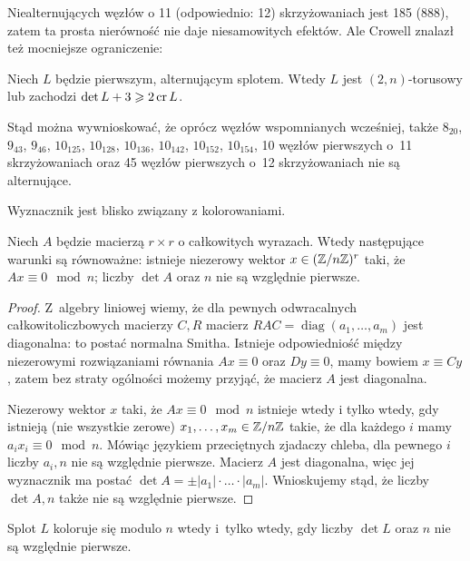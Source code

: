 Niealternujących węzłów o 11 (odpowiednio: 12) skrzyżowaniach jest 185 (888), zatem ta prosta nierówność nie daje niesamowitych efektów.
Ale Crowell znalazł też mocniejsze ograniczenie:

\begin{proposition}
    Niech $L$ będzie pierwszym, alternującym splotem.
    Wtedy $L$ jest $(2, n)$-torusowy lub zachodzi $\det L + 3 \geqslant 2 \operatorname{cr} L$.
\end{proposition}

Stąd można wywnioskować, że oprócz węzłów wspomnianych wcześniej, także $8_{20}$, 
$9_{43}$, $9_{46}$, $10_{125}$, $10_{128}$, $10_{136}$, $10_{142}$, $10_{152}$, $10_{154}$, 10 węzłów pierwszych o~11 skrzyżowaniach oraz 45 węzłów pierwszych o~12 skrzyżowaniach nie są alternujące.

Wyznacznik jest blisko związany z kolorowaniami.

\begin{lemma}
    Niech $A$ będzie macierzą $r \times r$ o całkowitych wyrazach.
    Wtedy następujące warunki są równoważne: istnieje niezerowy wektor $x \in (\mathbb Z/n\mathbb Z)^r$ taki, że $Ax \equiv 0 \mod n$; liczby $\det A$ oraz $n$ nie są względnie pierwsze.
\end{lemma}

\begin{proof}
    Z~algebry liniowej wiemy, że dla pewnych odwracalnych całkowitoliczbowych macierzy $C, R$ macierz $RAC = \operatorname{diag}(a_1, \ldots, a_m)$ jest diagonalna: to postać normalna Smitha.
    Istnieje odpowiedniość między niezerowymi rozwiązaniami równania $Ax \equiv 0$ oraz $Dy \equiv 0$, mamy bowiem $x \equiv Cy$, zatem bez straty ogólności możemy przyjąć, że macierz $A$ jest diagonalna.

    Niezerowy wektor $x$ taki, że $Ax \equiv 0 \mod n$ istnieje wtedy i tylko wtedy, gdy istnieją (nie wszystkie zerowe) $x_1, \ldots, x_m \in \mathbb Z/n\mathbb Z$ takie, że dla każdego $i$ mamy $a_ix_i \equiv 0 \mod n$.
    Mówiąc językiem przeciętnych zjadaczy chleba, dla pewnego $i$ liczby $a_i, n$ nie są względnie pierwsze.
    Macierz $A$ jest diagonalna, więc jej wyznacznik ma postać $\det A = \pm |a_1| \cdot \ldots \cdot |a_m|$.
    Wnioskujemy stąd, że liczby $\det A, n$ także nie są względnie pierwsze.
\end{proof}

\begin{proposition}
\label{prp:colour_determinant}%
    Splot $L$ koloruje się modulo $n$ wtedy i~tylko wtedy, gdy liczby $\det L$ oraz $n$ nie są względnie pierwsze.
\end{proposition}

